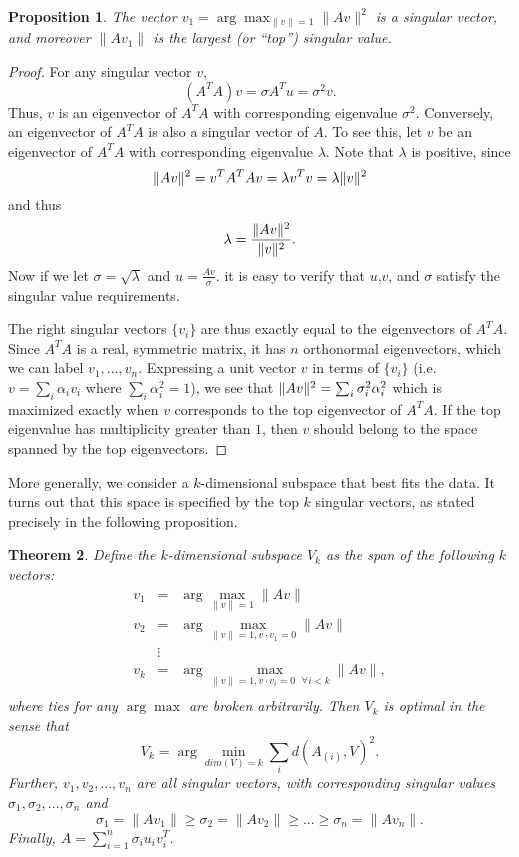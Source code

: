 \documentclass{book}
\newtheorem{theorem}{Theorem}[chapter]
\newtheorem{proposition}[theorem]{Proposition}
\numberwithin{exercise}{chapter}
\begin{document}
\begin{proposition}\label{topsingularvector}
The vector $v_1 = \arg\max_{\|v\| = 1}\|Av\|^2$ is a
singular vector, and moreover $\|Av_1\|$ is the largest (or ``top'') singular value.
\end{proposition}

\begin{proof}
For any singular vector $v$,
\[
(A^TA)v = \sigma A^T u = \sigma^2 v.
\]
Thus, $v$ is an eigenvector of $A^TA$ with
corresponding eigenvalue $\sigma^2$.  Conversely, an eigenvector of
$A^TA$ is also a singular vector of $A$.  To see this, let $v$ be an
eigenvector of $A^TA$ with corresponding eigenvalue $\lambda$.
Note that $\lambda$ is positive, since
\[
\|Av\|^2 = v^TA^TAv = \lambda v^Tv
= \lambda\|v\|^2
\]
and thus
\[
\lambda = \frac{\|Av\|^2}{\|v\|^2}.
\]
Now if we let $\sigma = \sqrt{\lambda}$ and $u = \frac{Av}{\sigma}$. it
is easy to verify that $u$,$v$, and $\sigma$ satisfy the singular
value requirements.

The right singular vectors $\{v_i\}$ are thus exactly equal to the
eigenvectors of $A^TA$.  Since $A^TA$ is a real, symmetric matrix, it
has $n$ orthonormal  eigenvectors, which we can label $v_1,...,v_n$.
Expressing a unit vector $v$ in terms of $\{v_i\}$ (i.e. $v = \sum_i
\alpha_i v_i$ where $\sum_i \alpha_i^2 = 1$), we see that $\|Av\|^2
= \sum_i \sigma_i^2 \alpha_i^2$ which is maximized exactly when $v$ corresponds
to the top eigenvector of $A^TA$. If the top eigenvalue has multiplicity greater than $1$,
then $v$ should belong to the space spanned by the top eigenvectors.
\end{proof}

More generally, we consider a $k$-dimensional subspace that best fits the
data. It turns out that this space is specified by the top $k$ singular
vectors, as stated precisely in the following proposition.

\begin{theorem}\label{thm:SVD}
Define the $k$-dimensional subspace $V_k$ as the span of the following $k$ vectors:
\begin{eqnarray*}
v_1 &=& \arg\max_{\|v\| = 1} \|Av\| \\
v_2 &=& \arg\max_{\|v\| = 1, v\cdot v_1 = 0} \|Av\| \\
&\vdots&\\
v_k &=& \arg\max_{\|v\| = 1, v\cdot v_i = 0 \mbox{ }\forall i < k} \|Av\|,  \\
\end{eqnarray*}
where ties for any $\arg\max$ are broken arbitrarily.
Then $V_k$ is \emph{optimal} in the sense that
\[
V_k = \arg\min_{dim(V) = k}\sum_i d(A_{(i)},V)^2.
\]
Further, $v_1,v_2,...,v_n$ are all singular vectors, with corresponding
singular values $\sigma_1,\sigma_2,...,\sigma_n$ and
\[
\sigma_1 = \|Av_1\| \ge \sigma_2=\|Av_2\| \ge ... \ge \sigma_n = \|Av_n\|.
\]
Finally, $A =\sum_{i=1}^n \sigma_i u_i v_i^T$.
\end{theorem}
\end{document}
